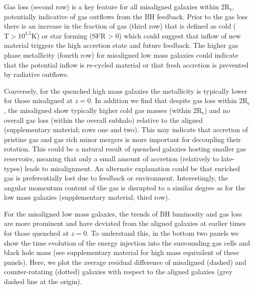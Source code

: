 \documentclass[fleqn,usenatbib]{mnras}
\begin{document}
Gas loss (second row) is a key feature for all misaligned galaxies within 2$\mathrm{R_{e}}$, potentially indicative of gas outflows from the BH feedback. Prior to the gas loss there is an increase in the fraction of gas (third row) that is defined as cold ($\mathrm{T > 10^{4.5}K}$) or star forming (SFR > 0) which could suggest that inflow of new material triggers the high accretion state and future feedback. The higher gas phase metallicity (fourth row) for misaligned low mass galaxies could indicate that the potential inflow is re-cycled material or that fresh accretion is prevented by radiative outflows.

Conversely, for the quenched high mass galaxies the metallicity is typically lower for those misaligned at $z=0$. In addition we find that despite gas loss within 2$\mathrm{R_{e}}$, the misaligned show typically higher cold gas masses (within 2$\mathrm{R_{e}}$) and no overall gas loss (within the overall subhalo) relative to the aligned (supplementary material; rows one and two). This may indicate that accretion of pristine gas and gas rich minor mergers is more important for decoupling their rotation. This could be a natural result of quenched galaxies hosting smaller gas reservoirs, meaning that only a small amount of accretion (relatively to late-types) leads to misalignment. An alternate explanation could be that enriched gas is preferentially lost due to feedback or environment. Interestingly, the angular momentum content of the gas is disrupted to a similar degree as for the low mass galaxies (supplementary material; third row).

For the misaligned low mass galaxies, the trends of BH luminosity and gas loss are more prominent and have deviated from the aligned galaxies at earlier times for those quenched at $z=0$. To understand this, in the bottom two panels we show the time evolution of the energy injection into the surrounding gas cells and black hole mass (see supplementary material for high mass equivalent of these panels). Here, we plot the average residual difference of misaligned (dashed) and counter-rotating (dotted) galaxies with respect to the aligned galaxies (grey dashed line at the origin). 
\end{document}
